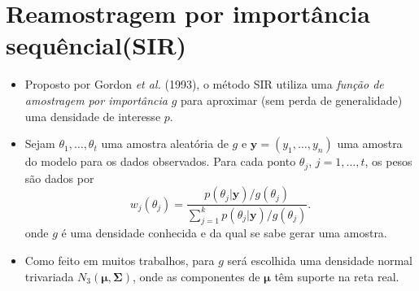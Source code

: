 \documentclass[9pt]{beamer}
\begin{document}
\section{Reamostragem por importância sequêncial(SIR)}
\begin{frame}
\begin{itemize}
\justifying	
\item Proposto por Gordon \textit{et al.} (1993), o método SIR utiliza uma \textit{função de amostragem por importância} $g$ para aproximar (sem perda de generalidade) uma densidade de interesse $p$.

\item Sejam $\theta_1, \ldots, \theta_t$ uma amostra aleatória de $g$ e $\bm{y} = (y_1, \ldots, y_n)$ uma amostra do modelo para os dados observados. Para cada ponto $\theta_j$, $j = 1, \ldots, t$, os pesos são dados por
\begin{equation}\label{eq:sir_wei}
w_j(\theta_j) = \dfrac{p(\theta_j | \bm{y}) / g(\theta_j)}{\sum_{j=1}^{k} p(\theta_j | \bm{y}) / g(\theta_j)}.
\end{equation}
onde $g$ é uma densidade conhecida e da qual se sabe gerar uma amostra. 
\item Como feito em muitos trabalhos, para $g$ será escolhida uma densidade normal trivariada $N_3(\bm{\mu}, \bm{\Sigma})$, onde as componentes de $\bm{\mu}$ têm suporte na reta real.
\end{itemize}
\end{frame}
\end{document}
